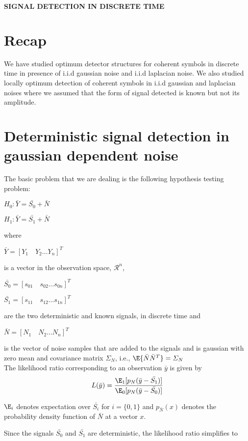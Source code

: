 \documentclass[12pt]{report}
\begin{document}
\maketitle
\begin{center}
	{\Large \bf SIGNAL DETECTION IN DISCRETE TIME}
\end{center}
\section{Recap}
	We have studied optimum detector structures for coherent symbols in discrete time in presence of i.i.d gaussian noise and i.i.d laplacian noise. We also studied locally optimum detection of coherent symbols in i.i.d gaussian and laplacian noises where we assumed that the form of signal detected is known but not its amplitude.  
\section{Deterministic signal detection in gaussian dependent noise}
The basic problem that we are dealing is the following hypothesis testing problem:
\begin{center}
	$H_0 : \bar{Y}  = \bar{S_0}+ \bar{N}$
\end{center}
\begin{center}
 	$ H_1 :\bar{Y} = \bar{S_1}+ \bar{N}$
 \end{center}
    where  
    \begin{center}
    	$\bar{Y}=[Y_1\quad  Y_2\dots Y_n ]^T$ 
    \end{center} is a vector in the observation space, $\mathcal{R}^n$,
    \begin{center}
    $\bar{S_0}=[s_{01}\quad  s_{02}\dots s_{0n} ]^T$ 
    \end{center}
    \begin{center}
    	 $\bar{S_1}=[s_{11}\quad  s_{12}\dots s_{1n} ]^T$
    \end{center}
are the two deterministic and known signals, in discrete time and
   
   	\begin{center}
   		 $\bar{N}=[N_1\quad  N_2\dots N_n ]^T$
   	\end{center}
   is the vector of noise samples that are added to the signals and is gaussian with zero mean and covariance matrix $\varSigma_{N}$, i.e., $\E\lbrace\bar{N}\bar{N}^T\rbrace= \varSigma_{N}$
   \\The likelihood ratio corresponding to an observation $\bar{y}$ is given by 
   \[L(\bar{y})=\frac{\E_1\lbrack p_N(\bar{y}-\bar{S_1})\rbrack}{\E_0\lbrack p_N(\bar{y}-\bar{S_0})\rbrack}\]
  \begin{rmk} $\E_i$ denotes expectation over $\bar{S_i}$ for $i=\{0,1\}$ and $p_{\bar{N}}(x)$ denotes the probability density function of $\bar{N}$ at a vector $x$.\end{rmk}
Since the signals $\bar{S_0}$ and $\bar{S_1}$ are deterministic, the likelihood ratio simplifies to 
 
\end{document}
